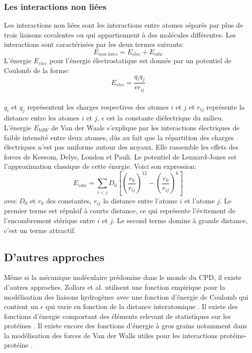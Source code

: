 \subsubsection{Les interactions non liées}
Les interactions non liées sont les interactions entre atomes séparés par plus de trois liaisons covalentes ou qui appartiennent à des molécules différentes. Les interactions sont caractérisées par les deux termes suivants:
\begin{equation}
E_{non\ liées} = E_{elec} + E_{vdw}  
\end{equation}
L'énergie $E_{elec}$ pour l'énergie électrostatique est donnée par un potentiel de Coulomb de la forme:
\begin{equation}
  E_{elec}=\frac{q_iq_j}{\epsilon r_{ij}}
\end{equation}\\
$q_i$ et $q_j$ représentent les charges respectives des atomes $i$ et $j$ et $r_{ij}$ représente la distance entre les atomes $i$ et $j$, $\epsilon$ est la constante diélectrique du milieu.
L'énergie  $E_{VdW}$ de Van der Waals s'explique par les interactions électriques de faible intensité entre deux atomes, dûs au fait que la répartition des charges électriques n'est pas uniforme autour des noyaux. Elle rassemble les effets des forces de Keesom, Delye, London et Pauli. Le potentiel de Lennard-Jones est l'approximation classique de cette énergie. Voici son expression:
\begin{equation}
    \label{VdW}
E_{vdw} = \sum_{i<j}D_0 [(\frac{r_0}{r_{ij}})^{12} - (\frac{r_0}{r_{ij}})^6]  
\end{equation}
avec $D_0$ et $r_0$ des constantes, $r_{ij}$ la distance entre l'atome $i$ et l'atome $j$. Le premier terme est répulsif à courte distance, ce qui représente l'évitement de l'encombrement stérique entre $i$ et $j$. Le second terme domine à grande distance, c'est un terme attractif. 
  

\subsection{D'autres approches}

Même si la mécanique moléculaire prédomine dans le monde du CPD, il existe d'autres approches. Zollars et al. utilisent une fonction empirique pour la modélisation des liaisons hydrogènes avec une fonction d'énergie de Coulomb qui contient un $\epsilon$ qui varie en fonction de la distance interatomique \cite{Zollars06}. Il existe des fonctions d'énergie comportant des éléments relevant de statistiques sur les protéines \cite{Pokala05}. Il existe encore des fonctions d'énergie à gros grains notamment dans la modélisation des forces de Van der Walls utiles pour les interactions protéine-protéine \cite{Korkut09}.

